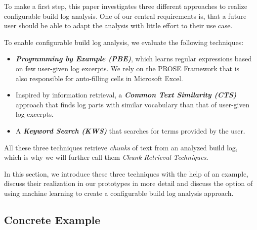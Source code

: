 To make a first step, this paper investigates three different approaches
to realize configurable build log analysis.
One of our central requirements is, that a future user should be able
to adapt the analysis with little effort to their use case.

To enable configurable build log analysis, we evaluate the following
techniques:
\begin{itemize}
  \item \textbf{\emph{Programming by Example (PBE)}}, which learns
  regular expressions based on few user-given log excerpts.
  We rely on the PROSE Framework  that is also responsible for auto-filling
  cells in Microsoft Excel.

  \item Inspired by information retrieval, a
  \textbf{\emph{Common Text Similarity (CTS)}} approach that finds log
  parts with similar vocabulary than that of user-given log excerpts.

  \item A \textbf{\emph{Keyword Search (KWS)}} that searches for terms
  provided by the user.
\end{itemize}

All these three techniques retrieve \emph{chunks} of text from an
analyzed build log, which is why we will further call them
\emph{Chunk Retrieval Techniques}.

In this section, we introduce these three techniques with the help of an
example, discuss their realization in our prototypes in more detail
and discuss the option of using machine learning to create a configurable
build log analysis approach.

\subsection{Concrete Example}
\label{sec:crt-example}

